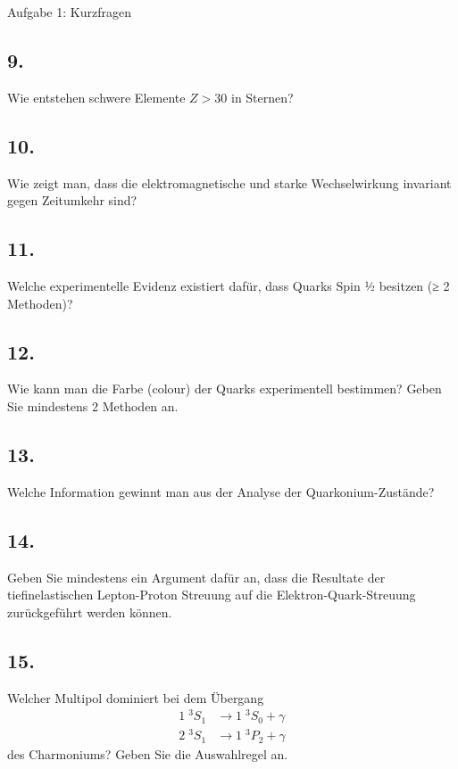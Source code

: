\begin{aufgabe}{Aufgabe 1: Kurzfragen}
    \subsection{9.}
    Wie entstehen schwere Elemente $Z > 30$ in Sternen?

    \subsection{10.}
    Wie zeigt man, dass die elektromagnetische und starke Wechselwirkung invariant gegen Zeitumkehr sind?

    \subsection{11.}
    Welche experimentelle Evidenz existiert dafür, dass Quarks Spin ½ besitzen (≥ 2 Methoden)?

    \subsection{12.}
    Wie kann man die Farbe (colour) der Quarks experimentell bestimmen?
    Geben Sie mindestens 2 Methoden an.

    \subsection{13.}
    Welche Information gewinnt man aus der Analyse der Quarkonium-Zustände?

    \subsection{14.}
    Geben Sie mindestens ein Argument dafür an,
    dass die Resultate der tiefinelastischen Lepton-Proton Streuung
    auf die Elektron-Quark-Streuung zurückgeführt werden können.

    \subsection{15.}
    Welcher Multipol dominiert bei dem Übergang
    \begin{align*}
        1 \; {}^3S_1 &\to 1 \; {}^3S_0 + \gamma \\
        2 \; {}^3S_1 &\to 1 \; {}^3P_2 + \gamma
    \end{align*}
    des Charmoniums?
    Geben Sie die Auswahlregel an.

\end{aufgabe}

